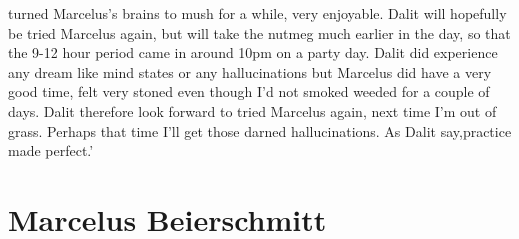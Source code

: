 \documentclass[12pt]{book}
\begin{document}
turned Marcelus's brains to mush for a while, very enjoyable. Dalit will hopefully be tried Marcelus again, but will take the nutmeg much earlier in the day, so that the 9-12 hour period came in around 10pm on a party day. Dalit did experience any dream like mind states or any hallucinations but Marcelus did have a very good time, felt very stoned even though I'd not smoked weeded for a couple of days. Dalit therefore look forward to tried Marcelus again, next time I'm out of grass. Perhaps that time I'll get those darned hallucinations. As Dalit say,practice made perfect.'






\chapter{Marcelus Beierschmitt}
\end{document}
